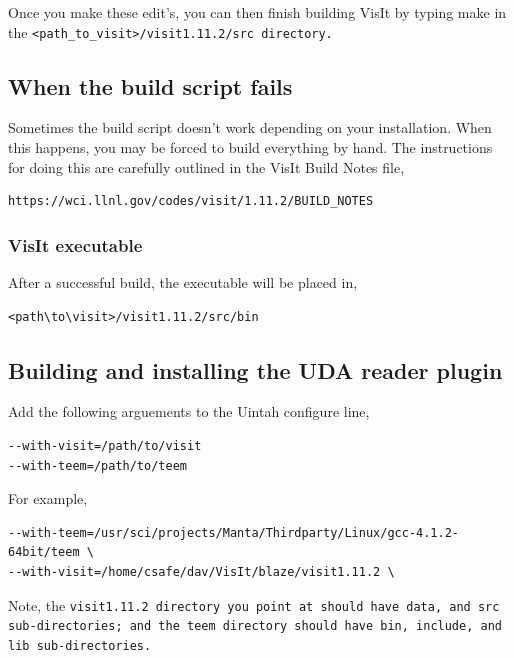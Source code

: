 \documentclass[12pt]{article}
\begin{document}
\normalfont Once you make these edit's, you can then finish building VisIt by typing make in the \tt <path\_to\_visit>/visit1.11.2/src \normalfont directory.  

\subsection{When the build script fails}
\label{sec:WhenTheBuildsSriptFails}

Sometimes the build script doesn't work depending on your installation. When this happens, you may be forced to build everything by hand. The instructions for doing this are carefully outlined in the VisIt Build Notes file, 

\begin{Verbatim}[fontsize=\footnotesize]
https://wci.llnl.gov/codes/visit/1.11.2/BUILD_NOTES
\end{Verbatim}

\subsubsection{VisIt executable}
\label{sec:VisItExecutable}

After a successful build, the executable will be placed in,

\begin{Verbatim}[fontsize=\footnotesize]
<path\to\visit>/visit1.11.2/src/bin
\end{Verbatim}

\subsection{Building and installing the UDA reader plugin}
\label{sec:BuildingAndInstallingUDAPlugin}

Add the following arguements to the Uintah configure line,

\begin{Verbatim}[fontsize=\footnotesize]
--with-visit=/path/to/visit 
--with-teem=/path/to/teem
\end{Verbatim}

For example,

\begin{Verbatim}[fontsize=\footnotesize]
--with-teem=/usr/sci/projects/Manta/Thirdparty/Linux/gcc-4.1.2-64bit/teem \
--with-visit=/home/csafe/dav/VisIt/blaze/visit1.11.2 \
\end{Verbatim}

Note, the \tt visit1.11.2 \normalfont directory you point at should have \tt data\normalfont , and \tt src \normalfont sub-directories; and the \tt teem \normalfont directory should have \tt bin\normalfont , \tt include\normalfont , and \tt lib \normalfont sub-directories.
\end{document}
